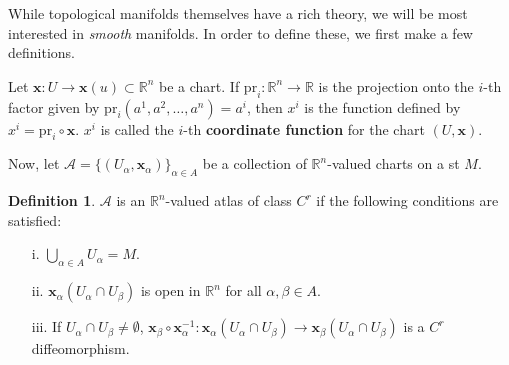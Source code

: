 \documentclass{article}
\theoremstyle{definition}
\newtheorem{defn}{Definition}[section]
\newcommand{\R}{\mathbb{R}}
\let\vec\mathbf
\begin{document}
While topological manifolds themselves have a rich theory, we will be most interested in \textit{smooth} manifolds. In order to define these, we first make a few definitions. 

Let $\vec{x}:U\rightarrow\vec{x}(u)\subset\R^{n}$ be a chart. If $\text{pr}_{i}:\R^{n}\rightarrow\R$ is the projection onto the $i$-th factor given by $\text{pr}_{i}(a^{1},a^{2},\dots,a^{n})=a^{i}$, then $x^{i}$ is the function defined by $x^{i}=\text{pr}_{i}\circ\vec{x}$. $x^{i}$ is called the $i$-th \textbf{coordinate function} for the chart $(U,\vec{x}).$

Now, let $\mathcal{A}=\{(U_{\alpha},\vec{x}_{\alpha})\}_{\alpha\in A}$ be a  collection of $\R^{n}$-valued charts on a st $M$. 
\begin{defn}
$\mathcal{A}$ is an $\R^{n}$-valued atlas of class $C^{r}$ if the following conditions are satisfied:
\begin{itemize}
\item[i.] $\bigcup_{\alpha\in A}U_{\alpha}=M.$
\item[ii.] $\vec{x}_{\alpha}(U_{\alpha}\cap U_{\beta})$ is open in $\R^{n}$ for all $\alpha,\beta\in A.$
\item[iii.] If $U_{\alpha}\cap U_{\beta}\not=\emptyset$,  $\vec{x}_{\beta}\circ\vec{x}_{\alpha}^{-1}:\vec{x}_{\alpha}(U_{\alpha}\cap U_{\beta})\rightarrow\vec{x}_{\beta}(U_{\alpha}\cap U_{\beta})$ is a $C^{r}$ diffeomorphism.
\end{itemize}
\end{defn}
\end{document}
